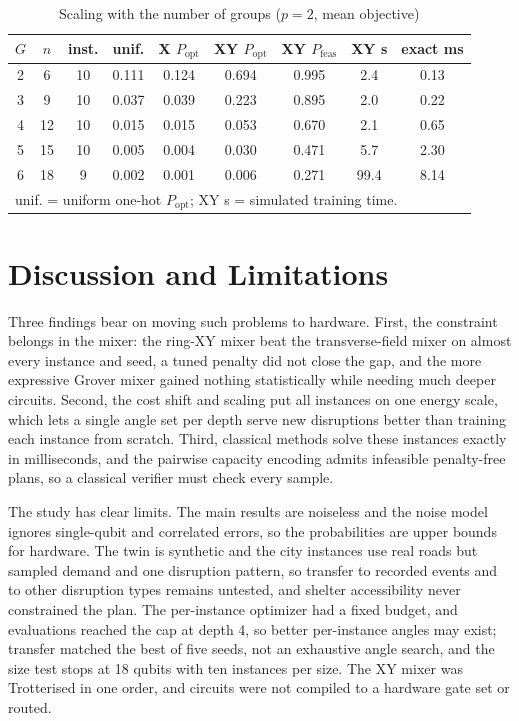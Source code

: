 \documentclass[conference]{IEEEtran}
\begin{document}
\begin{table}[t]
\caption{Scaling with the number of groups ($p=2$, mean objective)}
\label{tab:scale}
\centering
\footnotesize
\setlength{\tabcolsep}{2.4pt}
\begin{tabular}{ccccccccc}
\toprule
$G$ & $n$ & inst. & unif. & X $P_{\mathrm{opt}}$ & XY $P_{\mathrm{opt}}$ & XY $P_{\mathrm{feas}}$ & XY s & exact ms\\
\midrule
2 & 6 & 10 & 0.111 & 0.124 & 0.694 & 0.995 & 2.4 & 0.13\\
3 & 9 & 10 & 0.037 & 0.039 & 0.223 & 0.895 & 2.0 & 0.22\\
4 & 12 & 10 & 0.015 & 0.015 & 0.053 & 0.670 & 2.1 & 0.65\\
5 & 15 & 10 & 0.005 & 0.004 & 0.030 & 0.471 & 5.7 & 2.30\\
6 & 18 & 9 & 0.002 & 0.001 & 0.006 & 0.271 & 99.4 & 8.14\\
\bottomrule
\multicolumn{9}{l}{\scriptsize unif. = uniform one-hot $P_{\mathrm{opt}}$; XY s = simulated training time.}\\
\end{tabular}
\end{table}

\section{Discussion and Limitations}
Three findings bear on moving such problems to hardware. First, the constraint belongs in the mixer: the ring-XY mixer beat the transverse-field mixer on almost every instance and seed, a tuned penalty did not close the gap, and the more expressive Grover mixer gained nothing statistically while needing much deeper circuits. Second, the cost shift and scaling put all instances on one energy scale, which lets a single angle set per depth serve new disruptions better than training each instance from scratch. Third, classical methods solve these instances exactly in milliseconds, and the pairwise capacity encoding admits infeasible penalty-free plans, so a classical verifier must check every sample.

The study has clear limits. The main results are noiseless and the noise model ignores single-qubit and correlated errors, so the probabilities are upper bounds for hardware. The twin is synthetic and the city instances use real roads but sampled demand and one disruption pattern, so transfer to recorded events and to other disruption types remains untested, and shelter accessibility never constrained the plan. The per-instance optimizer had a fixed budget, and evaluations reached the cap at depth 4, so better per-instance angles may exist; transfer matched the best of five seeds, not an exhaustive angle search, and the size test stops at 18 qubits with ten instances per size. The XY mixer was Trotterised in one order, and circuits were not compiled to a hardware gate set or routed.
\end{document}
